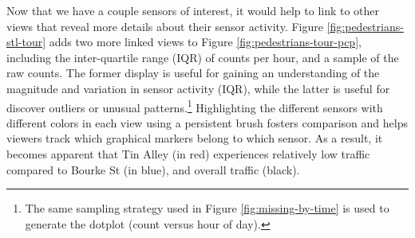 \documentclass[12pt,]{isuthesis}
\let\rmarkdownfootnote\footnote%
\def\footnote{\protect\rmarkdownfootnote}
\begin{document}
Now that we have a couple sensors of interest, it would help to link to
other views that reveal more details about their sensor activity. Figure
\ref{fig:pedestrians-stl-tour} adds two more linked views to Figure
\ref{fig:pedestrians-tour-pcp}, including the inter-quartile range (IQR)
of counts per hour, and a sample of the raw counts. The former display
is useful for gaining an understanding of the magnitude and variation in
sensor activity (IQR), while the latter is useful for discover outliers
or unusual patterns.\footnote{The same sampling strategy used in Figure
  \ref{fig:missing-by-time} is used to generate the dotplot (count
  versus hour of day).} Highlighting the different sensors with
different colors in each view using a persistent brush fosters
comparison and helps viewers track which graphical markers belong to
which sensor. As a result, it becomes apparent that Tin Alley (in red)
experiences relatively low traffic compared to Bourke St (in blue), and
overall traffic (black).
\end{document}
